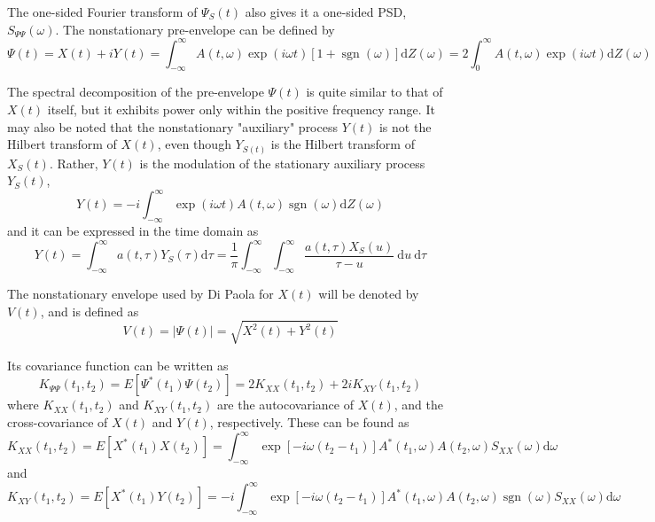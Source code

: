 \documentclass[12pt]{article}
\begin{document}
The one-sided Fourier transform of $\Psi_{S}(t)$ also gives it a one-sided PSD, $S_{\Psi \Psi}(\omega)$. The nonstationary pre-envelope can be defined by
\begin{equation}
\Psi(t)=X(t)+i Y(t)=\int_{-\infty}^{\infty} A(t, \omega) \exp (i \omega t)[1+\operatorname{sgn}(\omega)] \mathrm{d} Z(\omega)=2 \int_{0}^{\infty} A(t, \omega) \exp (i \omega t) \mathrm{d} Z(\omega)
\label{eq:26}
\end{equation}

The spectral decomposition of the pre-envelope $\Psi(t)$ is quite similar to that of $X(t)$ itself, but it exhibits power only within the positive frequency range. It may also be noted that the nonstationary "auxiliary" process $Y(t)$ is not the Hilbert transform of $X(t)$, even though $Y_{S(t)}$ is the Hilbert transform of $X_{S}(t)$. Rather, $Y(t)$ is the modulation of the stationary auxiliary process $Y_{S}(t)$,
\begin{equation}
Y(t)=-i \int_{-\infty}^{\infty} \exp (i \omega t) A(t, \omega) \operatorname{sgn}(\omega) \mathrm{d} Z(\omega)
\label{eq:27}
\end{equation}
and it can be expressed in the time domain as
\begin{equation}
Y(t)=\int_{-\infty}^{\infty} a(t, \tau) Y_{S}(\tau) \mathrm{d} \tau=\frac{1}{\pi} \int_{-\infty}^{\infty} \int_{-\infty}^{\infty} \frac{a(t, \tau) X_{S}(u)}{\tau-u} \mathrm{~d} u \mathrm{~d} \tau
\label{eq:28}
\end{equation}

The nonstationary envelope used by Di Paola for $X(t)$ will be denoted by $V(t)$, and is defined as
\begin{equation}
V(t)=|\Psi(t)|=\sqrt{X^{2}(t)+Y^{2}(t)}
\label{eq:29}
\end{equation}

Its covariance function can be written as
\begin{equation}
K_{\Psi \Psi}\left(t_{1}, t_{2}\right)=E\left[\Psi^{*}\left(t_{1}\right) \Psi\left(t_{2}\right)\right]=2 K_{X X}\left(t_{1}, t_{2}\right)+2 i K_{X Y}\left(t_{1}, t_{2}\right)
\label{eq:30}
\end{equation}
where $K_{X X}\left(t_{1}, t_{2}\right)$ and $K_{X Y}\left(t_{1}, t_{2}\right)$ are the autocovariance of $X(t)$, and the cross-covariance of $X(t)$ and $Y(t)$, respectively. These can be found as
\begin{equation}
K_{X X}\left(t_{1}, t_{2}\right)=E\left[X^{*}\left(t_{1}\right) X\left(t_{2}\right)\right]=\int_{-\infty}^{\infty} \exp \left[-i \omega\left(t_{2}-t_{1}\right)\right] A^{*}\left(t_{1}, \omega\right) A\left(t_{2}, \omega\right) S_{X X}(\omega) \mathrm{d} \omega
\label{eq:31}
\end{equation}
and
\begin{equation}
K_{X Y}\left(t_{1}, t_{2}\right)=E\left[X^{*}\left(t_{1}\right) Y\left(t_{2}\right)\right]=-i \int_{-\infty}^{\infty} \exp \left[-i \omega\left(t_{2}-t_{1}\right)\right] A^{*}\left(t_{1}, \omega\right) A\left(t_{2}, \omega\right) \operatorname{sgn}(\omega) S_{X X}(\omega) \mathrm{d} \omega
\label{eq:32}
\end{equation}
\end{document}
